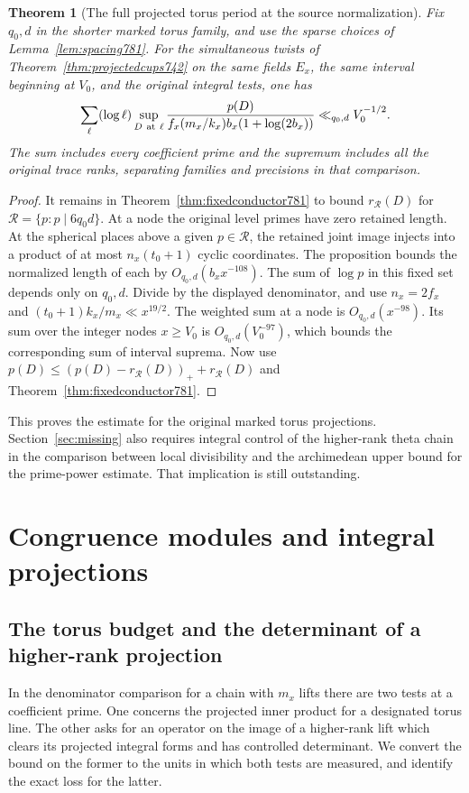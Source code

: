 \documentclass[a4paper,11pt]{article}
\newtheorem{theorem}[proposition]{Theorem}
\theoremstyle{definition}
\theoremstyle{remark}
\numberwithin{equation}{section}
\begin{document}
\begin{theorem}[The full projected torus period at the source normalization]
\leavevmode\label{thm:alltorus783}
Fix \(q_0,d\) in the shorter marked torus family, and use
the sparse choices of Lemma~\ref{lem:spacing781}. For
the simultaneous twists of Theorem~\ref{thm:projectedcups742}
on the same fields \(E_x\), the same interval beginning
at \(V_0\), and the original integral tests, one has
\[
  \sum_{\ell}(\log\ell)\sup_{D\ {\rm at}\ \ell}
       \frac{p(D)}{f_x(m_x/k_x)b_x(1+\log(2b_x))}
               \ll_{q_0,d} V_0^{-1/2}.
\]
The sum includes every coefficient prime and the supremum
includes all the original trace ranks, separating families
and precisions in that comparison.
\end{theorem}
\begin{proof}
It remains in Theorem~\ref{thm:fixedconductor781} to
bound \(r_{\mathcal R}(D)\) for \(\mathcal R=\{p:p\mid6q_0d\}\).
At a node the original level primes have zero retained
length. At the spherical places above a given
\(p\in\mathcal R\), the retained joint image injects
into a product of at most \(n_x(t_0+1)\) cyclic
coordinates. The proposition bounds the normalized
length of each by \(O_{q_0,d}(b_x x^{-108})\).
The sum of \(\log p\) in this fixed set depends only
on \(q_0,d\). Divide by the displayed denominator,
and use \(n_x=2f_x\) and
\((t_0+1)k_x/m_x\ll x^{19/2}\).
The weighted sum at a node is \(O_{q_0,d}(x^{-98})\).
Its sum over the integer nodes \(x\ge V_0\) is
\(O_{q_0,d}(V_0^{-97})\), which bounds the corresponding
sum of interval suprema. Now use
\(p(D)\le(p(D)-r_{\mathcal R}(D))_++r_{\mathcal R}(D)\)
and Theorem~\ref{thm:fixedconductor781}.
\end{proof}
This proves the estimate for the original marked torus
projections. Section~\ref{sec:missing} also requires
integral control of the higher-rank theta chain in the
comparison between local divisibility and the archimedean
upper bound for the prime-power estimate. That implication
is still outstanding.
\clearpage

\section{Congruence modules and integral projections}\label{nav:torus-modules}

\subsection{The torus budget and the determinant of a higher-rank projection}
\label{sec:projectionbudget784}
In the denominator comparison for a chain with \(m_x\)
lifts there are two tests at a coefficient prime. One
concerns the projected inner product for a designated
torus line. The other asks for an operator on the image
of a higher-rank lift which clears its projected integral
forms and has controlled determinant. We convert the
bound on the former to the units in which both tests
are measured, and identify the exact loss for the latter.
\end{document}
